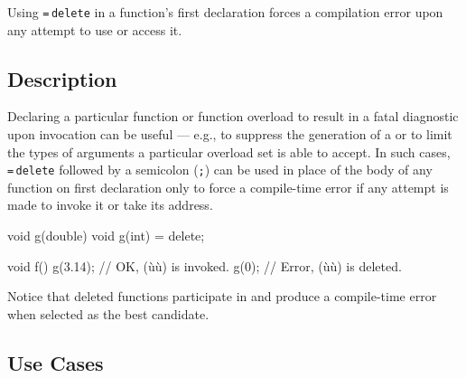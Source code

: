 
\setcounter{table}{0}
\setcounter{footnote}{0}
\setcounter{lstlisting}{0}

Using \lstinline!=!\,\lstinline!delete! in a function's first declaration
forces a compilation error upon any attempt to use or access it.

\subsection[Description]{Description}\label{description}

Declaring a particular function or function overload to result in a
fatal diagnostic upon invocation can be useful --- e.g., to suppress the
generation of a  or to limit the types of
arguments a particular overload set is able to accept. In such cases,
\lstinline!=!\,\lstinline!delete! followed by a semicolon (\lstinline!;!) can be used in place of the body of any
function on first declaration only to force a compile-time error if
any attempt is made to invoke it or take its address.

\begin{emcppslisting}
void g(double) { }
void g(int) = delete;

void f()
{
    g(3.14);  // OK, (ù{}ù) is invoked.
    g(0);     // Error, (ù{}ù) is deleted.
}
\end{emcppslisting}

\noindent Notice that deleted functions participate in 
and produce a compile-time error when selected as the best candidate.

\subsection[Use Cases]{Use Cases}\label{use-cases}

